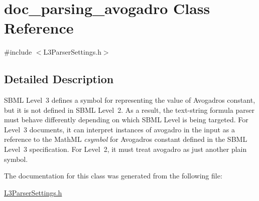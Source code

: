 \hypertarget{classdoc__parsing__avogadro}{}\section{doc\+\_\+parsing\+\_\+avogadro Class Reference}
\label{classdoc__parsing__avogadro}


{\ttfamily \#include $<$L3\+Parser\+Settings.\+h$>$}



\subsection{Detailed Description}
\begin{DoxyParagraph}{}
S\+B\+ML Level~3 defines a symbol for representing the value of Avogadro\textquotesingle{}s constant, but it is not defined in S\+B\+ML Level~2. As a result, the text-\/string formula parser must behave differently depending on which S\+B\+ML Level is being targeted. For Level~3 documents, it can interpret instances of {\ttfamily avogadro} in the input as a reference to the Math\+ML {\itshape csymbol} for Avogadro\textquotesingle{}s constant defined in the S\+B\+ML Level~3 specification. For Level~2, it must treat {\ttfamily avogadro} as just another plain symbol. 
\end{DoxyParagraph}


The documentation for this class was generated from the following file\+:\begin{DoxyCompactItemize}
\item 
\hyperlink{_l3_parser_settings_8h}{L3\+Parser\+Settings.\+h}\end{DoxyCompactItemize}
